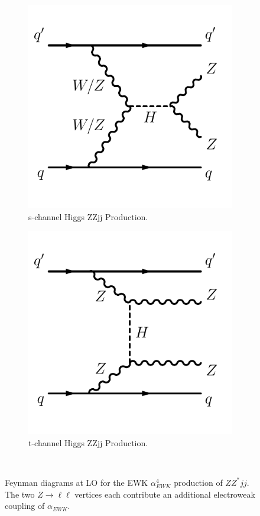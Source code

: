 \begin{figure}[!htbp]
\begin{subfigure}{.49\textwidth}
  \label{fig:ZZjjFeynmanDiag_EWk_b}
\end{subfigure}
\begin{subfigure}{.49\textwidth}
  \centering
  \includegraphics[width=.8\linewidth]{figures/Theory/diagramEWZZjjSchnHiggs.pdf}  
  \caption{s-channel Higgs ZZjj Production.}
  \label{fig:ZZjjFeynmanDiag_EWk_c}
\end{subfigure}
\begin{subfigure}{.49\textwidth}
  \centering
  \includegraphics[width=.8\linewidth]{figures/Theory/diagramEWZZjjTchnHiggs.pdf}  
  \caption{t-channel Higgs ZZjj Production.}
  \label{fig:ZZjjFeynmanDiag_EWk_d}
\end{subfigure}\\
\caption{Feynman diagrams at LO for the EWK $\alpha_{EWK}^4$ production of $ZZ^*jj$. The two $Z\rightarrow \ell \ell$ vertices each contribute an additional electroweak coupling of $\alpha_{EWK}$. }
\label{fig:ZZjjFeynmanDiag_EWk}
\end{figure}

